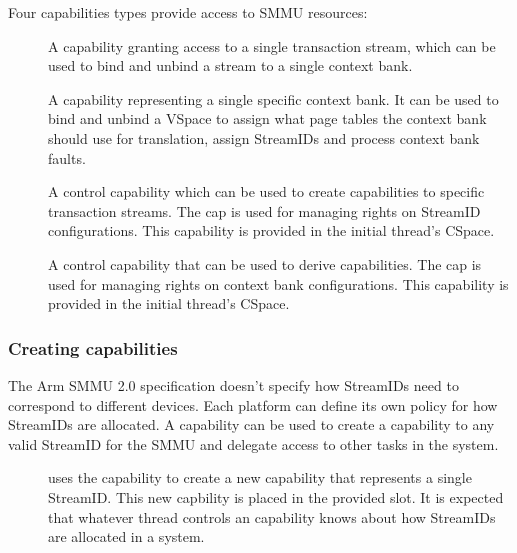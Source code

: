 Four capabilities types provide access to SMMU resources:
\begin{description}
    \item[] A capability granting access to a single
        transaction stream, which can be used to bind and unbind a stream to a
        single context bank.
    \item[] A capability representing a single specific context
        bank. It can be used to bind and unbind a VSpace to assign what page
        tables the context bank should use for translation, assign StreamIDs and
        process context bank faults.
    \item[] A control capability which can be used to
        create  capabilities to specific transaction streams.
        The  cap is used for managing rights on
        StreamID configurations. This capability is provided in the initial
        thread's CSpace.
    \item[] A control capability that can be used to
        derive  capabilities. The 
        cap is used for managing rights on context bank configurations.
        This capability is provided in the initial thread's CSpace.
\end{description}


\subsubsection{Creating  capabilities}
\label{sec:smmuv2-creating-sel4-arm-sid-capabilities}

The Arm SMMU 2.0 specification doesn't specify how StreamIDs need to correspond
to different devices. Each platform can define its own policy for how StreamIDs
are allocated. A  capability can be used to create
a capability to any valid StreamID for the SMMU and delegate access to other
tasks in the system.

\begin{description}
\item[] uses the
     capability to create a new 
    capability that represents a single StreamID.  This new capbility is placed
    in the provided slot.  It is expected that whatever thread controls an
     capability knows about how StreamIDs are
    allocated in a system.
\end{description}

